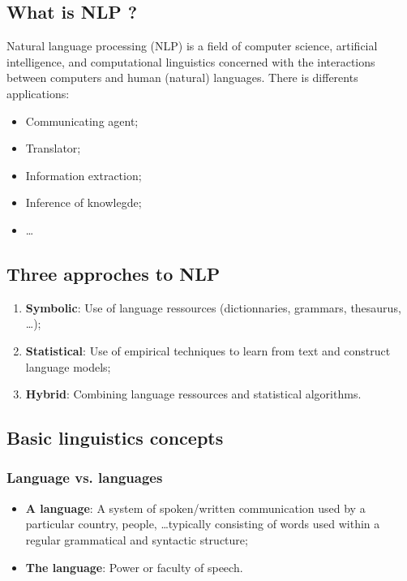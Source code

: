 
\subsection{What is NLP ?}

Natural language processing (NLP) is a field of computer science, artificial intelligence, and computational linguistics concerned with the interactions between computers and human (natural) languages. There is differents applications:
\begin{itemize}
	\item Communicating agent;
	\item Translator;
	\item Information extraction;
	\item Inference of knowlegde;
	\item \dots
\end{itemize}

\subsection{Three approches to NLP}

\begin{enumerate}
	\item \textbf{Symbolic}: Use of language ressources (dictionnaries, grammars, thesaurus, \dots);
	\item \textbf{Statistical}:  Use of empirical techniques to learn from text and construct language models;
	\item \textbf{Hybrid}: Combining language ressources and statistical algorithms.
\end{enumerate}

\subsection{Basic linguistics concepts}

\subsubsection{Language vs. languages}

\begin{itemize}
	\item \textbf{A language}: A system of spoken/written communication used by a particular country, people, \dots typically consisting of words used within a regular grammatical and syntactic structure;
	\item \textbf{The language}: Power or faculty of speech.
\end{itemize}


